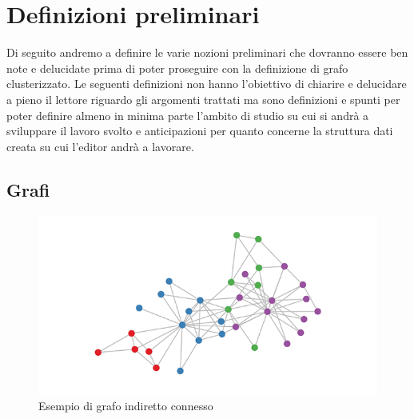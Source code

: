 \large
\section{Definizioni preliminari}
Di seguito andremo a definire le varie nozioni preliminari che dovranno essere ben note e delucidate prima di poter proseguire con la definizione di grafo clusterizzato. Le seguenti definizioni non hanno l'obiettivo di chiarire e delucidare a pieno il lettore riguardo gli argomenti trattati ma sono definizioni e spunti per poter definire almeno in minima parte l'ambito di studio su cui si andrà a sviluppare il lavoro svolto e anticipazioni per quanto concerne la struttura dati creata su cui l'editor andrà a lavorare.

\subsection{Grafi}
\begin{figure}[!htb]
	\begin{center}
		\includegraphics[width=0.7 \linewidth]{figure/grafoGenerico}
	\end{center}
	\caption{Esempio di grafo indiretto connesso \label{fig:grafoGenerico}}
\end{figure}

